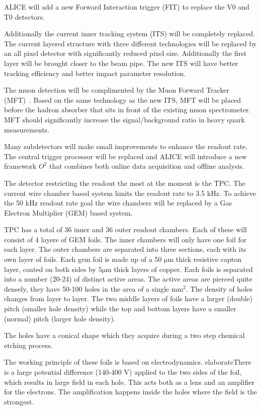 ALICE will add a new Forward Interaction trigger (FIT) to replace the V0 and T0 detectors. 

Additionally the current inner tracking system (ITS) will be completely replaced. The current layered structure with three different technologies will be replaced by an all pixel detector with significantly reduced pixel size. Additionally the first layer will be brought closer to the beam pipe. The new ITS will have better tracking efficiency and  better impact parameter resolution. 

The muon detection will be complimented by the Muon Forward Tracker (MFT)~\cite{mft}. Based on the same technology as the new ITS, MFT will be placed before the hadron absorber that sits in front of the existing muon spectrometer. MFT should significantly increase the signal/background ratio in heavy quark measurements.

Many subdetectors will make small improvements to enhance the readout rate. The central trigger processor will be replaced and ALICE will introduce a new framework $O^2$ that combines both online data acquisition and offline analysis.

The detector restricting the readout the most at the moment is the TPC. The current wire chamber based system  limits the readout rate to 3.5 kHz. To achieve the 50 kHz readout rate goal the wire chambers will be replaced by a Gas Electron Multiplier (GEM) based system.

TPC has a total of 36 inner and 36 outer readout chambers. Each of these will consist of 4 layers of GEM foils. The inner chambers will only have one foil for each layer. The outer chambers are separated into three sections, each with its own layer of foils. Each gem foil is made up of a 50 $\mathrm{\mu m}$ thick resistive capton layer, coated on both sides by $5 \mathrm{\mu m}$ thick layers of copper. Each foils is separated into a number (20-24) of distinct active areas. The active areas are pierced quite densely, they have 50-100 holes in the area of a single $\mathrm{mm^2}$. The density of holes changes from layer to layer. The two middle layers of foils have a larger (double) pitch (smaller hole density) while the top and bottom layers have a smaller (normal) pitch (larger hole density).

The holes have a conical shape which they acquire during a two step chemical etching process. 

The working principle of these foils is based on electrodynamics. {\color{red} elaborate}There is a large potential difference (140-400 V) applied to the two sides of the foil, which results in large field in each hole. This acts both as a lens and an amplifier for the electrons. The amplification happens inside the holes where the field is the strongest. 

